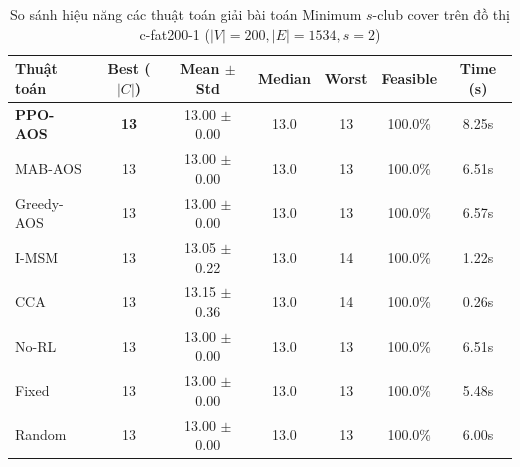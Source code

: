 \begin{table}[htbp]
\centering
\caption{So sánh hiệu năng các thuật toán giải bài toán Minimum $s$-club cover trên đồ thị c-fat200-1 ($|V|=200, |E|=1534, s=2$)}
\label{tab:results_c_fat200_1}
\begin{tabular}{lcccccc}
\hline
\textbf{Thuật toán} & \textbf{Best ($|C|$)} & \textbf{Mean $\pm$ Std} & \textbf{Median} & \textbf{Worst} & \textbf{Feasible} & \textbf{Time (s)} \\
\hline
\textbf{PPO-AOS} & \textbf{13} & 13.00 $\pm$ 0.00 & 13.0 & 13 & 100.0\% & 8.25s \\
MAB-AOS & 13 & 13.00 $\pm$ 0.00 & 13.0 & 13 & 100.0\% & 6.51s \\
Greedy-AOS & 13 & 13.00 $\pm$ 0.00 & 13.0 & 13 & 100.0\% & 6.57s \\
I-MSM & 13 & 13.05 $\pm$ 0.22 & 13.0 & 14 & 100.0\% & 1.22s \\
CCA & 13 & 13.15 $\pm$ 0.36 & 13.0 & 14 & 100.0\% & 0.26s \\
No-RL & 13 & 13.00 $\pm$ 0.00 & 13.0 & 13 & 100.0\% & 6.51s \\
Fixed & 13 & 13.00 $\pm$ 0.00 & 13.0 & 13 & 100.0\% & 5.48s \\
Random & 13 & 13.00 $\pm$ 0.00 & 13.0 & 13 & 100.0\% & 6.00s \\
\hline
\end{tabular}
\end{table}

